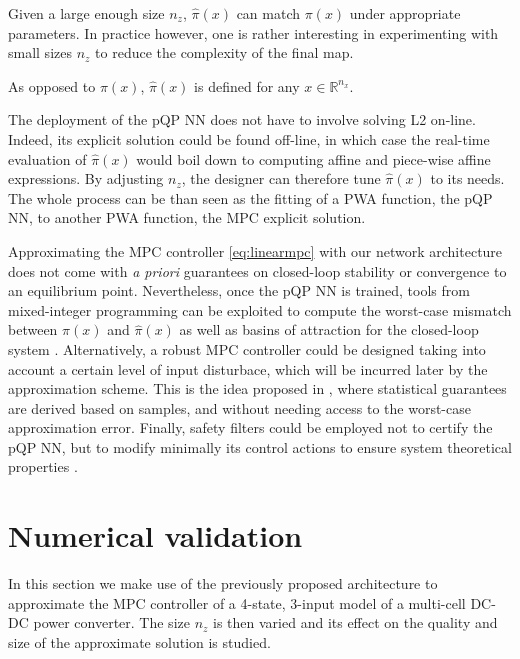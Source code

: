 \begin{remark}
	Given a large enough size $n_z$, $\hat\pi(x)$ can match $\pi(x)$ under appropriate parameters. In practice however, one is rather interesting in experimenting with small sizes $n_z$ to reduce the complexity of the final map.
\end{remark}

\begin{remark}
	As opposed to $\pi(x)$, $\hat\pi(x)$ is defined for any $x \in \mathbb{R}^{n_x}$.
\end{remark}

The deployment of the pQP NN does not have to involve solving L2 on-line. Indeed, its explicit solution could be found off-line, in which case the real-time evaluation of $\hat\pi(x)$ would boil down to computing affine and piece-wise affine expressions. By adjusting $n_z$, the designer can therefore tune $\hat\pi(x)$ to its needs. The whole process can be than seen as the fitting of a PWA function, the pQP NN, to another PWA function, the MPC explicit solution.

Approximating the MPC controller \eqref{eq:linearmpc} with our network architecture does not come with \textit{a priori} guarantees on closed-loop stability or convergence to an equilibrium point. Nevertheless, once the pQP NN is trained, tools from mixed-integer programming can be exploited to compute the worst-case mismatch between $\pi(x)$ and $\hat\pi(x)$ as well as basins of attraction for the closed-loop system \citep{schwan2022stability}. Alternatively, a robust MPC controller could be designed taking into account a certain level of input disturbace, which will be incurred later by the approximation scheme. This is the idea proposed in \cite{hertneck2018learning}, where statistical guarantees are derived based on samples, and without needing access to the worst-case approximation error. Finally, safety filters could be employed not to certify the pQP NN, but to modify minimally its control actions to ensure system theoretical properties \citep{wabersich2018linear}.

\section{Numerical validation}

In this section we make use of the previously proposed architecture to approximate the MPC controller of a 4-state, 3-input model of a multi-cell DC-DC power converter. The size $n_z$ is then varied and its effect on the quality and size of the approximate solution is studied.

